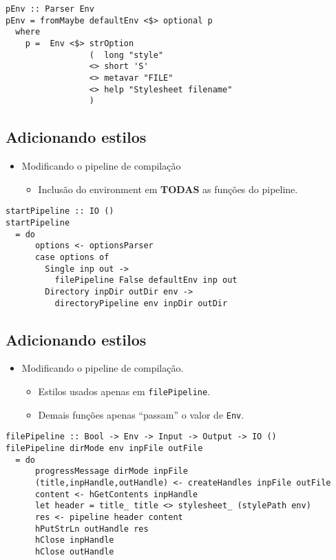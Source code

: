 \documentclass[11pt]{article}
\begin{document}
\begin{verbatim}
pEnv :: Parser Env
pEnv = fromMaybe defaultEnv <$> optional p
  where
    p =  Env <$> strOption
                 (  long "style"
                 <> short 'S'
                 <> metavar "FILE"
                 <> help "Stylesheet filename"
                 )
\end{verbatim}
\subsection*{Adicionando estilos}
\label{sec:org7aa5503}

\begin{itemize}
\item Modificando o pipeline de compilação
\begin{itemize}
\item Inclusão do environment em \textbf{TODAS} as funções do pipeline.
\end{itemize}
\end{itemize}

\begin{verbatim}
startPipeline :: IO ()
startPipeline
  = do
      options <- optionsParser
      case options of
        Single inp out ->
          filePipeline False defaultEnv inp out
        Directory inpDir outDir env ->
          directoryPipeline env inpDir outDir
\end{verbatim}
\subsection*{Adicionando estilos}
\label{sec:org12bad17}

\begin{itemize}
\item Modificando o pipeline de compilação.
\begin{itemize}
\item Estilos usados apenas em \texttt{filePipeline}.
\item Demais funções apenas ``passam'' o valor de \texttt{Env}.
\end{itemize}
\end{itemize}

\begin{verbatim}
filePipeline :: Bool -> Env -> Input -> Output -> IO ()
filePipeline dirMode env inpFile outFile 
  = do
      progressMessage dirMode inpFile
      (title,inpHandle,outHandle) <- createHandles inpFile outFile
      content <- hGetContents inpHandle
      let header = title_ title <> stylesheet_ (stylePath env) 
      res <- pipeline header content
      hPutStrLn outHandle res
      hClose inpHandle
      hClose outHandle
\end{verbatim}
\end{document}
